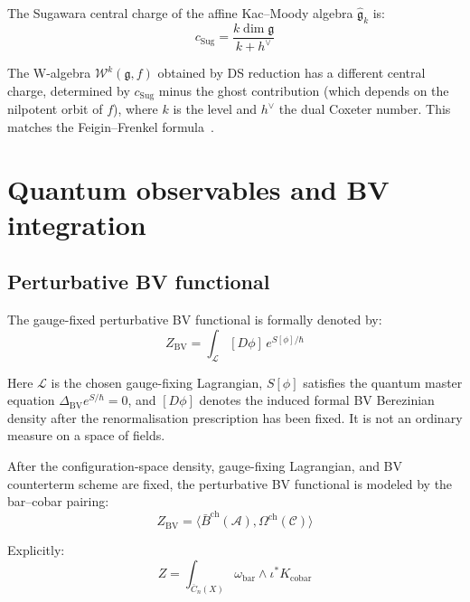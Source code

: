 \begin{theorem}
The Sugawara central charge of the affine Kac--Moody algebra $\widehat{\mathfrak{g}}_k$ is:
\[c_{\mathrm{Sug}} = \frac{k \dim \mathfrak{g}}{k + h^\vee}\]

The W-algebra $\mathcal{W}^k(\mathfrak{g}, f)$ obtained by DS reduction has a different central charge, determined by $c_{\mathrm{Sug}}$ minus the ghost contribution (which depends on the nilpotent orbit of $f$), where $k$ is the level and $h^\vee$ the dual Coxeter number. This matches the Feigin--Frenkel formula~\cite{Feigin-Frenkel}.
\end{theorem}

\section{Quantum observables and BV integration}

\subsection{Perturbative BV functional}

\begin{definition}
The gauge-fixed perturbative BV functional is formally denoted by:
\[Z_{\text{BV}} = \int_{\mathcal{L}} [D\phi] \, e^{S[\phi]/\hbar}\]

Here $\mathcal{L}$ is the chosen gauge-fixing Lagrangian,
$S[\phi]$ satisfies the quantum master equation
$\Delta_{\text{BV}} e^{S/\hbar} = 0$, and $[D\phi]$ denotes the
induced formal BV Berezinian density after the renormalisation
prescription has been fixed. It is not an ordinary measure on a
space of fields.
\end{definition}

\begin{remark}
After the configuration-space density, gauge-fixing Lagrangian, and BV
counterterm scheme are fixed, the perturbative BV functional is modeled
by the bar--cobar pairing:
\[Z_{\text{BV}} = \langle \bar{B}^{\text{ch}}(\mathcal{A}),
\Omega^{\text{ch}}(\mathcal{C}) \rangle\]

Explicitly:
\[Z = \int_{\overline{C}_n(X)} \omega_{\text{bar}} \wedge \iota^* K_{\text{cobar}}\]
\end{remark}

